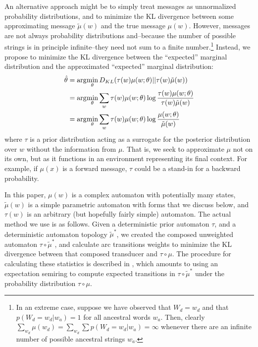 \documentclass[11pt,a4paper]{article}
\begin{document}
An alternative approach might be to simply treat messages as
unnormalized probability distributions, and to minimize the KL
divergence between some approximating message $\tilde\mu(w)$ and
the true message $\mu(w)$.  However, messages are not always
probability distributions and--because the number of possible
strings is in principle infinite--they need not sum to a finite
number.\footnote{In an extreme case, suppose we have observed that
$W_d=w_d$ and that $p(W_d=w_d|w_a)=1$ for all ancestral words $w_a$.
Then, clearly $\sum_{w_d} \mu(w_d) = \sum_{w_d} \sum p(W_d=w_d|w_a)
= \infty$ whenever there are an infinite number of possible ancestral
strings $w_a$.} Instead, we propose to minimize the KL divergence
between the ``expected'' marginal distribution and the approximated
``expected'' marginal distribution:
\begin{equation}
  \begin{split}
    \hat\theta &= \arg\negthinspace\min_{\theta} D_{KL}(\tau(w)\mu(w;\theta)||\tau(w)\tilde\mu(w) ) \\
    &= \arg\negthinspace\min_{\theta} \sum_w \tau(w) \mu(w;\theta) \log \frac{\tau(w)\mu(w;\theta)}{\tau(w)\tilde\mu(w)} \\
    &= \arg\negthinspace\min_{\theta} \sum_w \tau(w) \mu(w;\theta) \log \frac{\mu(w;\theta)}{\tilde\mu(w)} \\
   \end{split}
 \end{equation}
where $\tau$ is a prior distribution acting as a surrogate for the
posterior distribution over $w$ without the information from $\mu$.
That is, we seek to approximate $\mu$ not on its own, but as it
functions in an environment representing its final context. For
example, if $\mu(x)$ is a forward message, $\tau$ could be a stand-in
for a backward probability.

In this paper, $\mu(w)$ is a complex automaton with potentially
many states, $\tilde\mu(w)$ is a simple parametric automaton with
forms that we discuss below, and $\tau(w)$ is an arbitrary (but
hopefully fairly simple) automaton. The actual method we use is as
follows. Given a deterministic prior automaton $\tau$, and a
deterministic automaton topology $\tilde\mu^*$, we created the
composed unweighted automaton $\tau \circ \tilde\mu^*$, and calculate
arc transitions weights to minimize the KL divergence between that
composed transducer and $\tau\circ\mu$. The procedure for calculating
these statistics is described in , which
amounts to using an expectation semiring \cite{eisner2001expectation}
to compute expected transitions in $\tau\circ\tilde\mu^*$ under the
probability distribution $\tau\circ\mu$.
\end{document}
